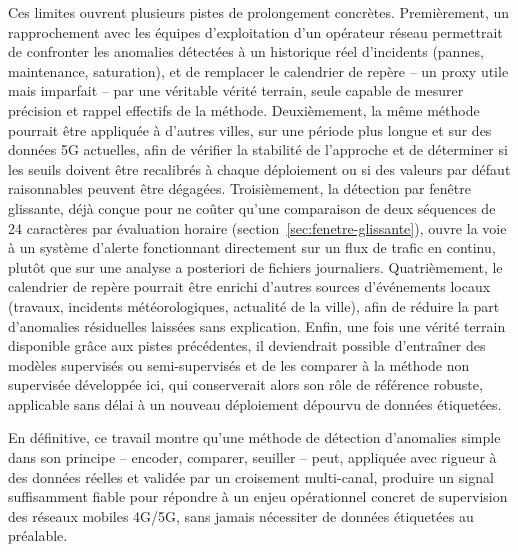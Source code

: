 Ces limites ouvrent plusieurs pistes de prolongement concrètes.
Premièrement, un rapprochement avec les équipes d'exploitation d'un
opérateur réseau permettrait de confronter les anomalies détectées à
un historique réel d'incidents (pannes, maintenance, saturation), et
de remplacer le calendrier de repère -- un proxy utile mais
imparfait -- par une véritable vérité terrain, seule capable de
mesurer précision et rappel effectifs de la méthode. Deuxièmement, la
même méthode pourrait être appliquée à d'autres villes, sur une
période plus longue et sur des données 5G actuelles, afin de vérifier
la stabilité de l'approche et de déterminer si les seuils doivent
être recalibrés à chaque déploiement ou si des valeurs par défaut
raisonnables peuvent être dégagées. Troisièmement, la détection par
fenêtre glissante, déjà conçue pour ne coûter qu'une comparaison de
deux séquences de 24 caractères par évaluation horaire
(section~\ref{sec:fenetre-glissante}), ouvre la voie à un système
d'alerte fonctionnant directement sur un flux de trafic en continu,
plutôt que sur une analyse a posteriori de fichiers journaliers.
Quatrièmement, le calendrier de repère pourrait être enrichi d'autres
sources d'événements locaux (travaux, incidents météorologiques,
actualité de la ville), afin de réduire la part d'anomalies
résiduelles laissées sans explication. Enfin, une fois une vérité
terrain disponible grâce aux pistes précédentes, il deviendrait
possible d'entraîner des modèles supervisés ou semi-supervisés et de
les comparer à la méthode non supervisée développée ici, qui
conserverait alors son rôle de référence robuste, applicable sans
délai à un nouveau déploiement dépourvu de données étiquetées.

En définitive, ce travail montre qu'une méthode de détection
d'anomalies simple dans son principe -- encoder, comparer, seuiller --
peut, appliquée avec rigueur à des données réelles et validée par un
croisement multi-canal, produire un signal suffisamment fiable pour
répondre à un enjeu opérationnel concret de supervision des réseaux
mobiles 4G/5G, sans jamais nécessiter de données étiquetées au
préalable.
